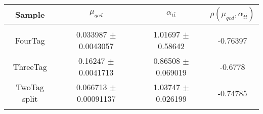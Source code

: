 \begin{footnotesize} 
\begin{tabular}{c|c|c|c} 
Sample & $\mu_{qcd}$ & $\alpha_{t\bar{t}}$ & $\rho(\mu_{qcd}, \alpha_{t\bar{t}})$ \\ 
\hline\hline 
& & & \\ 
FourTag & 0.033987 $\pm$ 0.0043057 & 1.01697 $\pm$ 0.58642 & -0.76397\\
ThreeTag & 0.16247 $\pm$ 0.0041713 & 0.86508 $\pm$ 0.069019 & -0.6778\\
TwoTag split & 0.066713 $\pm$ 0.00091137 & 1.03747 $\pm$ 0.026199 & -0.74785\\
& & & \\ 
\hline\hline 
\end{tabular} 
\end{footnotesize} 
\newline 
